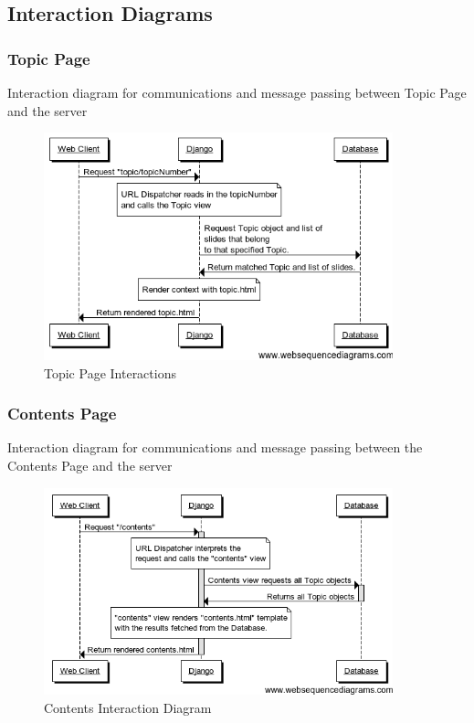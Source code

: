 \documentclass{l3proj}
\begin{document}
{\subsection{Interaction Diagrams}
\subsubsection{Topic Page}
Interaction diagram for communications and message passing between Topic Page and the server
\begin{figure}[!htb]
\caption{Topic Page Interactions}
 \centering
\includegraphics[width=0.9\textwidth]{images/topicPageMessagePassing.png}
\end{figure}

\subsubsection{Contents Page}
Interaction diagram for communications and message passing between the Contents Page and the server
\begin{figure}[!htb]
\caption{Contents Interaction Diagram}
 \centering
\includegraphics[width=0.9\textwidth]{images/contentsInteractionDiagram.png}
\end{figure}

}
\end{document}
